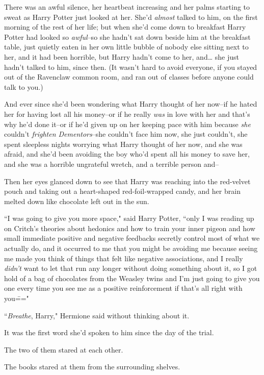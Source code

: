 There was an awful silence, her heartbeat increasing and her palms starting to sweat as Harry Potter just looked at her. She'd \emph{almost} talked to him, on the first morning of the rest of her life; but when she'd come down to breakfast Harry Potter had looked so \emph{awful}\---so she hadn't sat down beside him at the breakfast table, just quietly eaten in her own little bubble of nobody else sitting next to her, and it had been horrible, but Harry hadn't come to her, and{\ldots} she just hadn't talked to him, since then. (It wasn't hard to avoid everyone, if you stayed out of the Ravenclaw common room, and ran out of classes before anyone could talk to you.)

And ever since she'd been wondering what Harry thought of her now\---if he hated her for having lost all his money\---or if he really \emph{was} in love with her and that's why he'd done it\---or if he'd given up on her keeping pace with him because \emph{she} couldn't \emph{frighten Dementors}\---she couldn't face him now, she just couldn't, she spent sleepless nights worrying what Harry thought of her now, and she was afraid, and she'd been avoiding the boy who'd spent all his money to save her, and she was a horrible ungrateful wretch, and a terrible person and\---

Then her eyes glanced down to see that Harry was reaching into the red-velvet pouch and taking out a heart-shaped red-foil-wrapped candy, and her brain melted down like chocolate left out in the sun.

``I was going to give you more space," said Harry Potter, ``only I was reading up on Critch's theories about hedonics and how to train your inner pigeon and how small immediate positive and negative feedbacks secretly control most of what we actually do, and it occurred to me that you might be avoiding me because seeing me made you think of things that felt like negative associations, and I really \emph{didn't} want to let that run any longer without doing something about it, so I got hold of a bag of chocolates from the Weasley twins and I'm just going to give you one every time you see me as a positive reinforcement if that's all right with you\==="

``\emph{Breathe}, Harry," Hermione said without thinking about it.

It was the first word she'd spoken to him since the day of the trial.

The two of them stared at each other.

The books stared at them from the surrounding shelves.

